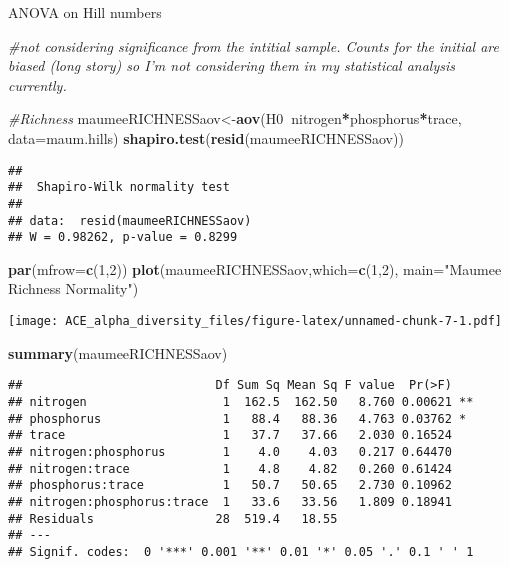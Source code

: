 \documentclass[]{article}
\newenvironment{Shaded}{\begin{snugshade}}{\end{snugshade}}
\newcommand{\KeywordTok}[1]{\textcolor[rgb]{0.13,0.29,0.53}{\textbf{#1}}}
\newcommand{\DataTypeTok}[1]{\textcolor[rgb]{0.13,0.29,0.53}{#1}}
\newcommand{\DecValTok}[1]{\textcolor[rgb]{0.00,0.00,0.81}{#1}}
\newcommand{\StringTok}[1]{\textcolor[rgb]{0.31,0.60,0.02}{#1}}
\newcommand{\CommentTok}[1]{\textcolor[rgb]{0.56,0.35,0.01}{\textit{#1}}}
\newcommand{\OperatorTok}[1]{\textcolor[rgb]{0.81,0.36,0.00}{\textbf{#1}}}
\newcommand{\NormalTok}[1]{#1}
\begin{document}
ANOVA on Hill numbers

\begin{Shaded}
\begin{Highlighting}[]
\CommentTok{#not considering significance from the intitial sample. Counts for the initial are biased (long story) so I'm not considering them in my statistical analysis currently. }

\CommentTok{#Richness}
\NormalTok{maumeeRICHNESSaov<-}\KeywordTok{aov}\NormalTok{(H0}\OperatorTok{~}\NormalTok{nitrogen}\OperatorTok{*}\NormalTok{phosphorus}\OperatorTok{*}\NormalTok{trace, }\DataTypeTok{data=}\NormalTok{maum.hills)}
\KeywordTok{shapiro.test}\NormalTok{(}\KeywordTok{resid}\NormalTok{(maumeeRICHNESSaov))}
\end{Highlighting}
\end{Shaded}

\begin{verbatim}
## 
##  Shapiro-Wilk normality test
## 
## data:  resid(maumeeRICHNESSaov)
## W = 0.98262, p-value = 0.8299
\end{verbatim}

\begin{Shaded}
\begin{Highlighting}[]
\KeywordTok{par}\NormalTok{(}\DataTypeTok{mfrow=}\KeywordTok{c}\NormalTok{(}\DecValTok{1}\NormalTok{,}\DecValTok{2}\NormalTok{))}
\KeywordTok{plot}\NormalTok{(maumeeRICHNESSaov,}\DataTypeTok{which=}\KeywordTok{c}\NormalTok{(}\DecValTok{1}\NormalTok{,}\DecValTok{2}\NormalTok{), }\DataTypeTok{main=}\StringTok{"Maumee Richness Normality"}\NormalTok{)}
\end{Highlighting}
\end{Shaded}

\texttt{[image: ACE\_alpha\_diversity\_files/figure-latex/unnamed-chunk-7-1.pdf]}

\begin{Shaded}
\begin{Highlighting}[]
\KeywordTok{summary}\NormalTok{(maumeeRICHNESSaov)}
\end{Highlighting}
\end{Shaded}

\begin{verbatim}
##                           Df Sum Sq Mean Sq F value  Pr(>F)   
## nitrogen                   1  162.5  162.50   8.760 0.00621 **
## phosphorus                 1   88.4   88.36   4.763 0.03762 * 
## trace                      1   37.7   37.66   2.030 0.16524   
## nitrogen:phosphorus        1    4.0    4.03   0.217 0.64470   
## nitrogen:trace             1    4.8    4.82   0.260 0.61424   
## phosphorus:trace           1   50.7   50.65   2.730 0.10962   
## nitrogen:phosphorus:trace  1   33.6   33.56   1.809 0.18941   
## Residuals                 28  519.4   18.55                   
## ---
## Signif. codes:  0 '***' 0.001 '**' 0.01 '*' 0.05 '.' 0.1 ' ' 1
\end{verbatim}
\end{document}
